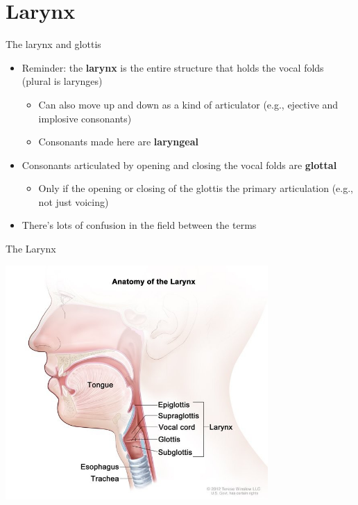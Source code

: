 \documentclass[professionalfonts]{beamer}
\begin{document}
\section*{Larynx}

\begin{frame}{The larynx and glottis}
    \begin{itemize}
        \item Reminder: the \textbf{larynx} is the entire structure that holds the vocal folds (plural is larynges)
        \begin{itemize}
            \item Can also move up and down as a kind of articulator (e.g., ejective and implosive consonants)
            \item Consonants made here are \textbf{laryngeal}
        \end{itemize}
        \item Consonants articulated by opening and closing the vocal folds are \textbf{glottal}
        \begin{itemize}
            \item Only if the opening or closing of the glottis the primary articulation (e.g., not just voicing)
        \end{itemize}
        \item There's lots of confusion in the field between the terms
    \end{itemize}
\end{frame}

\begin{frame}{The Larynx}
    \begin{center}
        \includegraphics[width = 0.75\textwidth]{figs/AnatamyLarynx.png}
    \end{center}
\end{frame}
\end{document}

